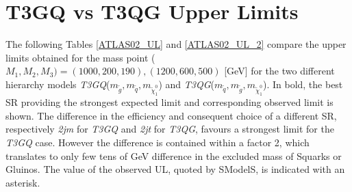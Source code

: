 \documentclass[a4paper,10pt]{article}
\newcommand{\SMO}{{\sc SModelS}}
\begin{document}
\section{T3GQ vs T3QG Upper Limits}
The following Tables \ref{ATLAS02_UL} and \ref{ATLAS02_UL_2}  compare the upper limits obtained for the mass point ($M_1,M_2,M_3) = (1000,200,190),(1200,600,500)$ [GeV] for the two different hierarchy models \textit{T3GQ}($m_{\tilde g}, m_{\tilde q}, m_{\tilde \chi _1 ^0 }$) and \textit{T3QG}($m_{\tilde q}, m_{\tilde g}, m_{\tilde \chi _1 ^0 }$). In bold, the best SR providing the strongest expected limit and corresponding observed limit is shown. The difference in the efficiency and consequent choice of a different SR, respectively \textit{2jm} for \textit{T3GQ} and \textit{2jt} for \textit{T3QG}, favours a strongest limit for the \textit{T3GQ} case. However the difference is contained within a factor 2, which translates to only few tens of GeV difference in the excluded mass of Squarks or Gluinos. The value of the observed UL, quoted by \SMO, is indicated with an asterisk. 
\end{document}
